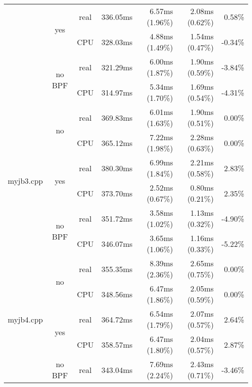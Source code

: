 \documentclass[en]{pracamgr}
\begin{document}
\begin{appendices}
\begin{small}
\begin{longtable}{|l|c|c|r|r|r|r|}
                            \cline{2-7}
                            & \multirow{2}{*}{yes}    & real & 336.05ms & 6.57ms (1.96\%) & 2.08ms (0.62\%) & 0.58\% \\*
                            &                         & CPU  & 328.03ms & 4.88ms (1.49\%) & 1.54ms (0.47\%) & -0.34\% \\*
                            \cline{2-7}
                            & \multirow{2}{*}{no BPF} & real & 321.29ms & 6.00ms (1.87\%) & 1.90ms (0.59\%) & -3.84\% \\*
                            &                         & CPU  & 314.97ms & 5.34ms (1.70\%) & 1.69ms (0.54\%) & -4.31\% \\
\hline
\multirow{6}{*}{myjb3.cpp}  & \multirow{2}{*}{no}     & real & 369.83ms & 6.01ms (1.63\%) & 1.90ms (0.51\%) & 0.00\% \\*
                            &                         & CPU  & 365.12ms & 7.22ms (1.98\%) & 2.28ms (0.63\%) & 0.00\% \\*
                            \cline{2-7}
                            & \multirow{2}{*}{yes}    & real & 380.30ms & 6.99ms (1.84\%) & 2.21ms (0.58\%) & 2.83\% \\*
                            &                         & CPU  & 373.70ms & 2.52ms (0.67\%) & 0.80ms (0.21\%) & 2.35\% \\*
                            \cline{2-7}
                            & \multirow{2}{*}{no BPF} & real & 351.72ms & 3.58ms (1.02\%) & 1.13ms (0.32\%) & -4.90\% \\*
                            &                         & CPU  & 346.07ms & 3.65ms (1.06\%) & 1.16ms (0.33\%) & -5.22\% \\
\hline
\multirow{6}{*}{myjb4.cpp}  & \multirow{2}{*}{no}     & real & 355.35ms & 8.39ms (2.36\%) & 2.65ms (0.75\%) & 0.00\% \\*
                            &                         & CPU  & 348.56ms & 6.47ms (1.86\%) & 2.05ms (0.59\%) & 0.00\% \\*
                            \cline{2-7}
                            & \multirow{2}{*}{yes}    & real & 364.72ms & 6.54ms (1.79\%) & 2.07ms (0.57\%) & 2.64\% \\*
                            &                         & CPU  & 358.57ms & 6.47ms (1.80\%) & 2.04ms (0.57\%) & 2.87\% \\*
                            \cline{2-7}
                            & \multirow{2}{*}{no BPF} & real & 343.04ms & 7.69ms (2.24\%) & 2.43ms (0.71\%) & -3.46\% \\*

\end{longtable}
\end{small}
\end{appendices}
\end{document}
